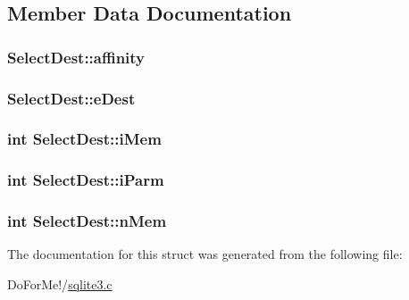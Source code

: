 \subsection{Member Data Documentation}
\hypertarget{struct_select_dest_a7a5b76f4fd40a1b84356fc58e0d6b173}{
\subsubsection[{affinity}]{ Select\-Dest\-::affinity}}\label{struct_select_dest_a7a5b76f4fd40a1b84356fc58e0d6b173}
\hypertarget{struct_select_dest_a779c1809acadd15898db0b20e31cc23f}{
\subsubsection[{e\-Dest}]{ Select\-Dest\-::e\-Dest}}\label{struct_select_dest_a779c1809acadd15898db0b20e31cc23f}
\hypertarget{struct_select_dest_ab060aa655304afa76b1a2f923a2b0ae5}{
\subsubsection[{i\-Mem}]{\setlength{\rightskip}{0pt plus 5cm}int Select\-Dest\-::i\-Mem}}\label{struct_select_dest_ab060aa655304afa76b1a2f923a2b0ae5}
\hypertarget{struct_select_dest_a6ca726a6f8054df61baa150c5010c53f}{
\subsubsection[{i\-Parm}]{\setlength{\rightskip}{0pt plus 5cm}int Select\-Dest\-::i\-Parm}}\label{struct_select_dest_a6ca726a6f8054df61baa150c5010c53f}
\hypertarget{struct_select_dest_a1868d637be46616a4206fd8ff9f4ac52}{
\subsubsection[{n\-Mem}]{\setlength{\rightskip}{0pt plus 5cm}int Select\-Dest\-::n\-Mem}}\label{struct_select_dest_a1868d637be46616a4206fd8ff9f4ac52}


The documentation for this struct was generated from the following file\-:\begin{DoxyCompactItemize}
\item 
Do\-For\-Me!/\hyperlink{sqlite3_8c}{sqlite3.\-c}\end{DoxyCompactItemize}
